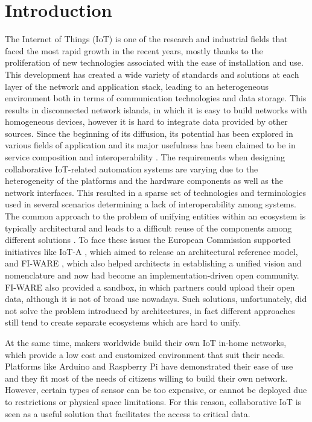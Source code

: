 \section{Introduction}
The Internet of Things (IoT) is one of the research and industrial fields that faced the most rapid growth in the recent years, mostly thanks to the proliferation of new technologies associated with the ease of installation and use.
This development has created a wide variety of standards and solutions at each layer of the network and application stack, leading to an heterogeneous environment both in terms of communication technologies and data storage.
This results in disconnected network islands, in which it is easy to build networks with homogeneous devices, however it is hard to integrate data provided by other sources.
Since the beginning of its diffusion, its potential has been explored in various fields of application and its major usefulness has been claimed to be in service composition and interoperability \cite{atzori2010internet}. The requirements when designing collaborative IoT-related automation systems are varying due to the heterogeneity of the platforms and the hardware components as well as the network interfaces.
This resulted in a sparse set of technologies and terminologies used in several scenarios determining a lack of interoperability among systems.
The common approach to the problem of unifying entities within an ecosystem is typically architectural and leads to a difficult reuse of the components among different solutions \cite{krco2014designing}.
To face these issues the European Commission supported initiatives like IoT-A \cite{iot-a}, which aimed to release an architectural reference model, and FI-WARE \cite{fiware}, which also helped architects in establishing a unified vision and nomenclature and now had become an implementation-driven open community.
FI-WARE also provided a sandbox, in which partners could upload their open data, although it is not of broad use nowadays.
Such solutions, unfortunately, did not solve the problem introduced by architectures, in fact different approaches still tend to create separate ecosystems which are hard to unify.

At the same time, makers worldwide build their own IoT in-home networks, which provide a low cost and customized environment that suit their needs.
Platforms like Arduino \cite{arduino} and Raspberry Pi \cite{raspberry} have demonstrated their ease of use and they fit most of the needs of citizens willing to build their own network.
However, certain types of sensor can be too expensive, or cannot be deployed due to restrictions or physical space limitations.
For this reason, collaborative IoT is seen as a useful solution that facilitates the access to critical data.

